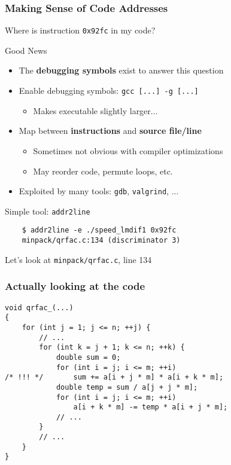 \documentclass[xcolor={x11names,svgnames}]{beamer}
\begin{document}

\begin{frame}[fragile]
  \frametitle{Making Sense of Code Addresses}

  Where is instruction \texttt{0x92fc} in my code?

  \begin{exampleblock}{Good News}
    \begin{itemize}
    \item The \textbf{debugging symbols} exist to answer this question
    \item Enable debugging symbols: \texttt{gcc [...] -g [...]}
      \begin{itemize}
      \item Makes executable slightly larger...
      \end{itemize}
    \item Map between \textbf{instructions} and \textbf{source file/line}
      \begin{itemize}
      \item Sometimes not obvious with compiler optimizations
      \item May reorder code, permute loops, etc. 
      \end{itemize}
    \item Exploited by many tools: \texttt{gdb}, \texttt{valgrind}, ...
    \end{itemize}
  \end{exampleblock}

  \begin{block}{Simple tool: \texttt{addr2line}}
    \begin{verbatim}
    $ addr2line -e ./speed_lmdif1 0x92fc
    minpack/qrfac.c:134 (discriminator 3)
\end{verbatim}
    Let's look at \texttt{minpack/qrfac.c}, line 134
  \end{block}  
\end{frame}


\begin{frame}[fragile]
  \frametitle{Actually looking at the code}

  \begin{verbatim}
void qrfac_(...)
{
    for (int j = 1; j <= n; ++j) {
        // ...     
        for (int k = j + 1; k <= n; ++k) {
            double sum = 0;
            for (int i = j; i <= m; ++i)
/* !!! */       sum += a[i + j * m] * a[i + k * m];
            double temp = sum / a[j + j * m];
            for (int i = j; i <= m; ++i)
                a[i + k * m] -= temp * a[i + j * m];
            // ...
        }
        // ...  
    }
}
\end{verbatim}
\end{frame}
\end{document}
